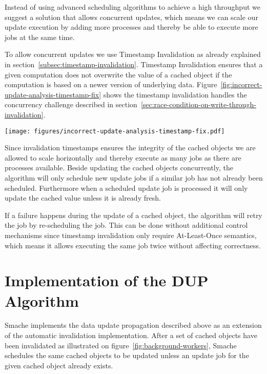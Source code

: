 Instead of using advanced scheduling algorithms to achieve a high throughput we suggest a solution that allows concurrent updates, which means we can scale our update execution by adding more processes and thereby be able to execute more jobs at the same time.

To allow concurrent updates we use Timestamp Invalidation as already explained in section~\ref{subsec:timestamp-invalidation}. Timestamp Invalidation ensures that a given computation does not overwrite the value of a cached object if the computation is based on a newer version of underlying data. Figure~\ref{fig:incorrect-update-analysis-timestamp-fix} shows the timestamp invalidation handles the concurrency challenge described in section~\ref{sec:race-condition-on-write-through-invalidation}.

\begin{figure*}[ht!]
  \centering
  \texttt{[image: figures/incorrect-update-analysis-timestamp-fix.pdf]}
  \caption{How Invalidation Timestamps fixes the concurrency problem described in figure~\ref{fig:incorrect-updates-analysis}.}
  \label{fig:incorrect-update-analysis-timestamp-fix}
\end{figure*}

Since invalidation timestamps ensures the integrity of the cached objects we are allowed to scale horizontally and thereby execute as many jobs as there are processes available. Beside updating the cached objects concurrently, the algorithm will only schedule new update jobs if a similar job has not already been scheduled. Furthermore when a scheduled update job is processed it will only update the cached value unless it is already fresh.

If a failure happens during the update of a cached object, the algorithm will retry the job by re-scheduling the job. This can be done without additional control mechanisms since timestamp invalidation only require At-Least-Once semantics, which means it allows executing the same job twice without affecting correctness.


\section{Implementation of the DUP Algorithm}
\label{sec:implementing-the-data-updata-propagation-algorithm}

Smache implements the data update propagation described above as an extension of the automatic invalidation implementation. After a set of cached objects have been invalidated as illustrated on figure~\ref{fig:background-workers}, Smache schedules the same cached objects to be updated unless an update job for the given cached object already exists.

